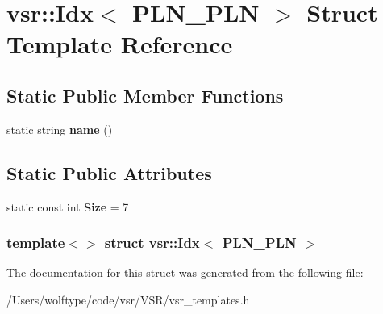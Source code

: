 \hypertarget{structvsr_1_1_idx_3_01_p_l_n___p_l_n_01_4}{\section{vsr\-:\-:Idx$<$ P\-L\-N\-\_\-\-P\-L\-N $>$ Struct Template Reference}
\label{structvsr_1_1_idx_3_01_p_l_n___p_l_n_01_4}
}
\subsection*{Static Public Member Functions}
\begin{DoxyCompactItemize}
\item 
\hypertarget{structvsr_1_1_idx_3_01_p_l_n___p_l_n_01_4_adb5e4d96145c68a7762182a5fca49e79}{static string {\bfseries name} ()}\label{structvsr_1_1_idx_3_01_p_l_n___p_l_n_01_4_adb5e4d96145c68a7762182a5fca49e79}

\end{DoxyCompactItemize}
\subsection*{Static Public Attributes}
\begin{DoxyCompactItemize}
\item 
\hypertarget{structvsr_1_1_idx_3_01_p_l_n___p_l_n_01_4_ae409f30e9dc1d0160eee70dce501a220}{static const int {\bfseries Size} = 7}\label{structvsr_1_1_idx_3_01_p_l_n___p_l_n_01_4_ae409f30e9dc1d0160eee70dce501a220}

\end{DoxyCompactItemize}
\subsubsection*{template$<$$>$ struct vsr\-::\-Idx$<$ P\-L\-N\-\_\-\-P\-L\-N $>$}



The documentation for this struct was generated from the following file\-:\begin{DoxyCompactItemize}
\item 
/\-Users/wolftype/code/vsr/\-V\-S\-R/vsr\-\_\-templates.\-h\end{DoxyCompactItemize}
